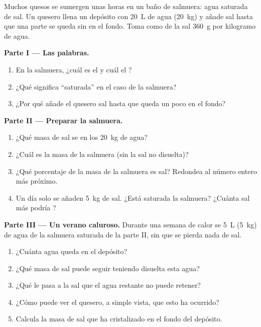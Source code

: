 \begin{problem}
\label{pb:g6:solutions-and-solubility:1}
Muchos quesos se sumergen unas horas en un baño de salmuera: agua
saturada de sal. Un quesero llena un depósito con \qty{20}{L} de agua
(\qty{20}{kg}) y añade sal hasta que una parte se queda sin  en
el fondo. Toma como  de la sal \qty{360}{g} por kilogramo de
agua.

\medskip
\noindent\textbf{Parte I --- Las palabras.}
\begin{enumerate}
  \item En la salmuera, ¿cuál es el  y cuál el ?
  \item ¿Qué significa ``saturada'' en el caso de la salmuera?
  \item ¿Por qué añade el quesero sal hasta que queda un poco en el
        fondo?
\end{enumerate}

\medskip
\noindent\textbf{Parte II --- Preparar la salmuera.}
\begin{enumerate}[resume]
  \item ¿Qué masa de sal se  en los \qty{20}{kg} de agua?
  \item ¿Cuál es la masa de la salmuera (sin la sal no disuelta)?
  \item ¿Qué porcentaje de la masa de la salmuera es sal? Redondea al
        número entero más próximo.
  \item Un día solo se añaden \qty{5}{kg} de sal. ¿Está saturada la
        salmuera? ¿Cuánta sal más podría ?
\end{enumerate}

\medskip
\noindent\textbf{Parte III --- Un verano caluroso.}
Durante una semana de calor se  \qty{5}{L} (\qty{5}{kg}) de agua
de la salmuera saturada de la parte II, sin que se pierda nada de sal.
\begin{enumerate}[resume]
  \item ¿Cuánta agua queda en el depósito?
  \item ¿Qué masa de sal puede seguir teniendo disuelta esta agua?
  \item ¿Qué le pasa a la sal que el agua restante no puede retener?
  \item ¿Cómo puede ver el quesero, a simple vista, que esto ha
        ocurrido?
  \item Calcula la masa de sal que ha cristalizado en el fondo del
        depósito.
\end{enumerate}
\end{problem}
